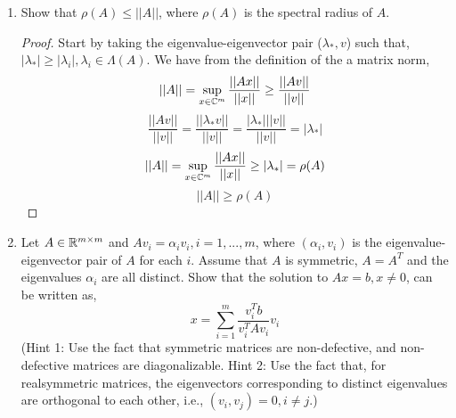 \documentclass{article}
\begin{document}
\begin{enumerate}
\begin{enumerate}
\begin{proof}
        \end{proof}

        \item
        Show that $I - A$ is nonsingular
        \begin{proof}
            To show that $\I - A$ is nonsingular we simply need to show that $\det(\I - A) \neq 0$. We have, 
            \[
                \det(\I - A) = (-1)^m\det(A - \I)
            \]
            We notice that $\det(A - \I)$ looks very similar to the definition of the characteristic polynomial, $\det(A - \lambda\I)$. We have then by the definition of a characteristic polynomial, 
            \[
                \det(\I - A) = (-1)^m\det(A - \I) = 0, \text{ if and only if } \lambda = 1 \text{ is an eigenvalue of } A.
            \]
            We have from part (a) of the problem that all eigenvalues of $A$ are pure imaginary, i.e. $\lambda \neq 1$. Therefore
            \[
                \det(\I - A) = (-1)^m\det(A - \I) \neq 0
            \]
            Therefore, $\I - A$ is nonsingular by definition. 
        \end{proof}

     \end{enumerate}
    
     \item 
      Show that $\rho(A) \le ||A||$, where $\rho(A)$ is the spectral radius of $A$.
    
    \begin{proof}

    Start by taking the eigenvalue-eigenvector pair ($\lambda_*, v$) such that, $|\lambda_*| \ge |\lambda_i|, \lambda_i \in \Lambda(A)$. We have from the definition of the a matrix norm, 
    \[
        ||A|| = \sup_{x \in \mathbb{C}^m} \frac{||Ax||}{||x||} \ge \frac{||Av||}{||v||}
    \]
    \[
        \frac{||Av||}{||v||} = \frac{||\lambda_* v||}{||v||} = \frac{|\lambda_*| ||v||}{||v||} = |\lambda_*|
    \]
    \[
        ||A|| = \sup_{x \in \mathbb{C}^m} \frac{||Ax||}{||x||} \ge |\lambda_*| = \rho(A)
    \]
    \[
        ||A|| \ge \rho(A)   
    \]
    \end{proof}

    \item 
    Let $A \in \mathbb{R}^{m\times m}$ and $Av_i = \alpha_i v_i, i = 1, . . . , m$, where $(\alpha_i , v_i)$ is the eigenvalue-eigenvector pair of $A$ for each $i$. Assume that $A$ is symmetric, $A = A^T$ and the eigenvalues $\alpha_i$ are all distinct. Show that the solution to $Ax = b, x \neq 0$, can be written as, 
\[
    x = \sum_{i=1}^m\frac{v_i^Tb}{v_i^TAv_i}v_i
\]
(Hint 1: Use the fact that symmetric matrices are non-defective, and non-defective matrices are diagonalizable. Hint 2: Use the fact that, for realsymmetric matrices, the eigenvectors corresponding to distinct eigenvalues are orthogonal to each other, i.e., $(v_i , v_j) = 0, i \neq j.$)
   

\end{enumerate}
\end{document}
